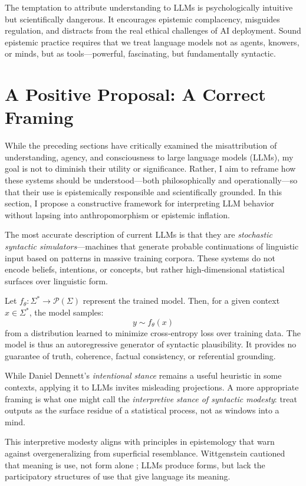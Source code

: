 \documentclass[12pt]{article}
\theoremstyle{plain}
\theoremstyle{definition}
\theoremstyle{remark}
\begin{document}
The temptation to attribute understanding to LLMs is psychologically intuitive but scientifically dangerous. It encourages epistemic complacency, misguides regulation, and distracts from the real ethical challenges of AI deployment. Sound epistemic practice requires that we treat language models not as agents, knowers, or minds, but as tools—powerful, fascinating, but fundamentally syntactic.

\section{A Positive Proposal: A Correct Framing}

While the preceding sections have critically examined the misattribution of understanding, agency, and consciousness to large language models (LLMs), my goal is not to diminish their utility or significance. Rather, I aim to reframe how these systems should be understood—both philosophically and operationally—so that their use is epistemically responsible and scientifically grounded. In this section, I propose a constructive framework for interpreting LLM behavior without lapsing into anthropomorphism or epistemic inflation.

The most accurate description of current LLMs is that they are \textit{stochastic syntactic simulators}—machines that generate probable continuations of linguistic input based on patterns in massive training corpora. These systems do not encode beliefs, intentions, or concepts, but rather high-dimensional statistical surfaces over linguistic form.

Let \( f_\theta: \Sigma^* \rightarrow \mathcal{P}(\Sigma) \) represent the trained model. Then, for a given context \( x \in \Sigma^* \), the model samples:
\[
y \sim f_\theta(x)
\]
from a distribution learned to minimize cross-entropy loss over training data. The model is thus an autoregressive generator of syntactic plausibility. It provides no guarantee of truth, coherence, factual consistency, or referential grounding.

While Daniel Dennett’s \textit{intentional stance} \parencite{dennett1989intentional} remains a useful heuristic in some contexts, applying it to LLMs invites misleading projections. A more appropriate framing is what one might call the \textit{interpretive stance of syntactic modesty}: treat outputs as the surface residue of a statistical process, not as windows into a mind.

This interpretive modesty aligns with principles in epistemology that warn against overgeneralizing from superficial resemblance. Wittgenstein cautioned that meaning is use, not form alone \parencite{wittgenstein1953philosophical}; LLMs produce forms, but lack the participatory structures of use that give language its meaning.
\end{document}
